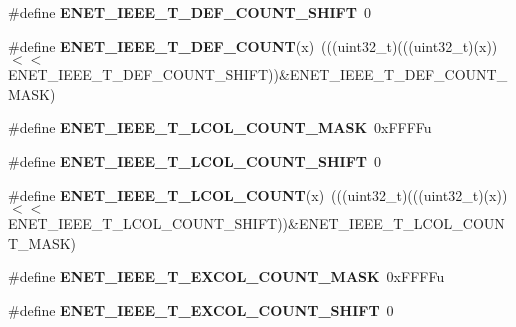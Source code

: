 \begin{DoxyCompactItemize}
\item 
\#define {\bfseries E\+N\+E\+T\+\_\+\+I\+E\+E\+E\+\_\+\+T\+\_\+\+D\+E\+F\+\_\+\+C\+O\+U\+N\+T\+\_\+\+S\+H\+I\+FT}~0\hypertarget{group__ENET__Register__Masks_gabbce06689e842f4caf2a19b2df8893c6}{}\label{group__ENET__Register__Masks_gabbce06689e842f4caf2a19b2df8893c6}

\item 
\#define {\bfseries E\+N\+E\+T\+\_\+\+I\+E\+E\+E\+\_\+\+T\+\_\+\+D\+E\+F\+\_\+\+C\+O\+U\+NT}(x)~(((uint32\+\_\+t)(((uint32\+\_\+t)(x))$<$$<$E\+N\+E\+T\+\_\+\+I\+E\+E\+E\+\_\+\+T\+\_\+\+D\+E\+F\+\_\+\+C\+O\+U\+N\+T\+\_\+\+S\+H\+I\+FT))\&E\+N\+E\+T\+\_\+\+I\+E\+E\+E\+\_\+\+T\+\_\+\+D\+E\+F\+\_\+\+C\+O\+U\+N\+T\+\_\+\+M\+A\+SK)\hypertarget{group__ENET__Register__Masks_ga31ed2c1faca96c342cc4f2f9cc304d23}{}\label{group__ENET__Register__Masks_ga31ed2c1faca96c342cc4f2f9cc304d23}

\item 
\#define {\bfseries E\+N\+E\+T\+\_\+\+I\+E\+E\+E\+\_\+\+T\+\_\+\+L\+C\+O\+L\+\_\+\+C\+O\+U\+N\+T\+\_\+\+M\+A\+SK}~0x\+F\+F\+F\+Fu\hypertarget{group__ENET__Register__Masks_ga041ada9082f15cabd8d535dba84fbfba}{}\label{group__ENET__Register__Masks_ga041ada9082f15cabd8d535dba84fbfba}

\item 
\#define {\bfseries E\+N\+E\+T\+\_\+\+I\+E\+E\+E\+\_\+\+T\+\_\+\+L\+C\+O\+L\+\_\+\+C\+O\+U\+N\+T\+\_\+\+S\+H\+I\+FT}~0\hypertarget{group__ENET__Register__Masks_ga2c352d386efb6087a1449f6ff8e49e28}{}\label{group__ENET__Register__Masks_ga2c352d386efb6087a1449f6ff8e49e28}

\item 
\#define {\bfseries E\+N\+E\+T\+\_\+\+I\+E\+E\+E\+\_\+\+T\+\_\+\+L\+C\+O\+L\+\_\+\+C\+O\+U\+NT}(x)~(((uint32\+\_\+t)(((uint32\+\_\+t)(x))$<$$<$E\+N\+E\+T\+\_\+\+I\+E\+E\+E\+\_\+\+T\+\_\+\+L\+C\+O\+L\+\_\+\+C\+O\+U\+N\+T\+\_\+\+S\+H\+I\+FT))\&E\+N\+E\+T\+\_\+\+I\+E\+E\+E\+\_\+\+T\+\_\+\+L\+C\+O\+L\+\_\+\+C\+O\+U\+N\+T\+\_\+\+M\+A\+SK)\hypertarget{group__ENET__Register__Masks_ga3b0b578f77880f92db4d4515d5307a67}{}\label{group__ENET__Register__Masks_ga3b0b578f77880f92db4d4515d5307a67}

\item 
\#define {\bfseries E\+N\+E\+T\+\_\+\+I\+E\+E\+E\+\_\+\+T\+\_\+\+E\+X\+C\+O\+L\+\_\+\+C\+O\+U\+N\+T\+\_\+\+M\+A\+SK}~0x\+F\+F\+F\+Fu\hypertarget{group__ENET__Register__Masks_ga4b5fe7076adb4e19e1271ca3f6f27d16}{}\label{group__ENET__Register__Masks_ga4b5fe7076adb4e19e1271ca3f6f27d16}

\item 
\#define {\bfseries E\+N\+E\+T\+\_\+\+I\+E\+E\+E\+\_\+\+T\+\_\+\+E\+X\+C\+O\+L\+\_\+\+C\+O\+U\+N\+T\+\_\+\+S\+H\+I\+FT}~0\hypertarget{group__ENET__Register__Masks_gab0ed20dee5a8a4ad851053c9bb9359e8}{}\label{group__ENET__Register__Masks_gab0ed20dee5a8a4ad851053c9bb9359e8}


\end{DoxyCompactItemize}
